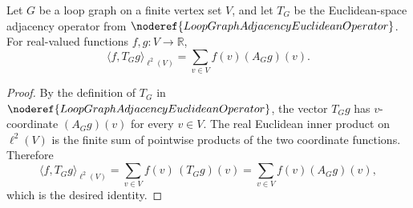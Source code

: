 \begin{helper}
Let \(G\) be a loop graph on a finite vertex set \(V\), and let \(T_G\) be the
Euclidean-space adjacency operator from \(\noderef{LoopGraphAdjacencyEuclideanOperator}\).
For real-valued functions \(f,g\colon V\to\mathbb R\),
\[
  \langle f,T_Gg\rangle_{\ell^2(V)}
  =
  \sum_{v\in V} f(v)(A_Gg)(v).
\]
\end{helper}
\begin{proof}
By the definition of \(T_G\) in \(\noderef{LoopGraphAdjacencyEuclideanOperator}\),
the vector \(T_Gg\) has \(v\)-coordinate \((A_Gg)(v)\) for every \(v\in V\).
The real Euclidean inner product on \(\ell^2(V)\) is the finite sum of pointwise
products of the two coordinate functions.  Therefore
\[
  \langle f,T_Gg\rangle_{\ell^2(V)}
  =
  \sum_{v\in V} f(v)\,(T_Gg)(v)
  =
  \sum_{v\in V} f(v)(A_Gg)(v),
\]
which is the desired identity.
\end{proof}
